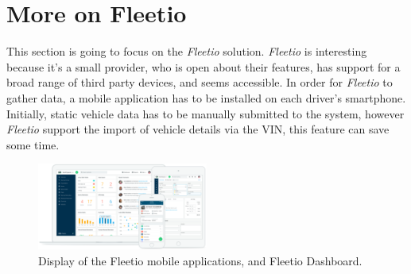 \section{More on Fleetio}
This section is going to focus on the \textit{Fleetio} solution.
\textit{Fleetio} is interesting because it's a small provider, who is open about their features, has support for a broad range of third party devices, and seems accessible.
In order for \textit{Fleetio} to gather data, a mobile application has to be installed on each driver's smartphone.
Initially, static vehicle data has to be manually submitted to the system, however \textit{Fleetio} support the import of vehicle details via the \ac{VIN}, this feature can save some time.

\begin{figure}[h!]
    \centering
    \includegraphics[width=0.5\textwidth]{img/fleetio.png}
    \caption{Display of the Fleetio mobile applications, and Fleetio Dashboard.}
    \label{fig:Fleetio_Devices}
\end{figure}

